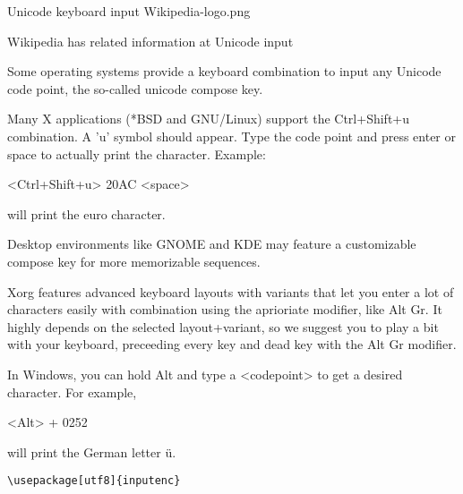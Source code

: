 \documentclass{article}
\begin{document}
    
    Unicode keyboard input
Wikipedia-logo.png 	

Wikipedia has related information at Unicode input

Some operating systems provide a keyboard combination to input any Unicode code point, the so-called unicode compose key.

Many X applications (*BSD and GNU/Linux) support the Ctrl+Shift+u combination. A 'u' symbol should appear. Type the code point and press enter or space to actually print the character. Example:

<Ctrl+Shift+u> 20AC <space>

will print the euro character.

Desktop environments like GNOME and KDE may feature a customizable compose key for more memorizable sequences.

Xorg features advanced keyboard layouts with variants that let you enter a lot of characters easily with combination using the aprioriate modifier, like Alt Gr. It highly depends on the selected layout+variant, so we suggest you to play a bit with your keyboard, preceeding every key and dead key with the Alt Gr modifier.

In Windows, you can hold Alt and type a <codepoint> to get a desired character. For example,

<Alt> + 0252

will print the German letter ü.

\begin{verbatim}
\usepackage[utf8]{inputenc}
\end{verbatim}
\end{document}
